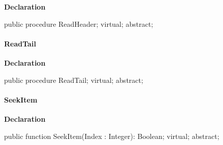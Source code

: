 \documentclass{report}
\newif\ifpdf
\begin{document}
\label{AbArcTyp.TAbArchiveStreamHelper-ReadHeader}
\begin{list}{}{
\setlength{\itemindent}{0cm}
\setlength{\listparindent}{0cm}
\setlength{\leftmargin}{\evensidemargin}
\addtolength{\leftmargin}{\tmplength}
\settowidth{\labelsep}{X}
\addtolength{\leftmargin}{\labelsep}
\setlength{\labelwidth}{\tmplength}
}
\item[\textbf{Declaration}\hfill]
\ifpdf
\begin{flushleft}
\fi
\begin{ttfamily}
public procedure ReadHeader; virtual; abstract;\end{ttfamily}

\ifpdf
\end{flushleft}
\fi

\end{list}
\paragraph*{ReadTail}\hspace*{\fill}

\label{AbArcTyp.TAbArchiveStreamHelper-ReadTail}
\begin{list}{}{
\setlength{\itemindent}{0cm}
\setlength{\listparindent}{0cm}
\setlength{\leftmargin}{\evensidemargin}
\addtolength{\leftmargin}{\tmplength}
\settowidth{\labelsep}{X}
\addtolength{\leftmargin}{\labelsep}
\setlength{\labelwidth}{\tmplength}
}
\item[\textbf{Declaration}\hfill]
\ifpdf
\begin{flushleft}
\fi
\begin{ttfamily}
public procedure ReadTail; virtual; abstract;\end{ttfamily}

\ifpdf
\end{flushleft}
\fi

\end{list}
\paragraph*{SeekItem}\hspace*{\fill}

\label{AbArcTyp.TAbArchiveStreamHelper-SeekItem}
\begin{list}{}{
\setlength{\itemindent}{0cm}
\setlength{\listparindent}{0cm}
\setlength{\leftmargin}{\evensidemargin}
\addtolength{\leftmargin}{\tmplength}
\settowidth{\labelsep}{X}
\addtolength{\leftmargin}{\labelsep}
\setlength{\labelwidth}{\tmplength}
}
\item[\textbf{Declaration}\hfill]
\ifpdf
\begin{flushleft}
\fi
\begin{ttfamily}
public function SeekItem(Index : Integer): Boolean; virtual; abstract;\end{ttfamily}

\ifpdf
\end{flushleft}
\fi

\end{list}
\end{document}
